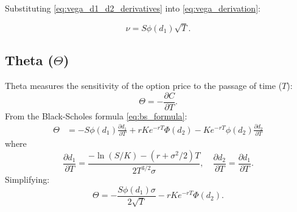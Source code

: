        Substituting \eqref{eq:vega_d1_d2_derivatives} into \eqref{eq:vega_derivation}:

        \begin{equation}
            \nu = S \phi(d_1) \sqrt{T}.
            \label{eq:vega_result}
        \end{equation}

    \subsection{Theta ($\Theta$)}
        Theta measures the sensitivity of the option price to the passage of time ($T$):
        \begin{equation}
            \Theta = -\frac{\partial C}{\partial T}.
            \label{eq:theta_definition}
        \end{equation}
        From the Black-Scholes formula \eqref{eq:bs_formula}:
        \begin{align}
            \Theta &=
                -S \phi(d_1) \frac{\partial d_1}{\partial T}
                + rK e^{-rT} \Phi(d_2)
                - K e^{-rT} \phi(d_2) \frac{\partial d_2}{\partial T}
            \label{eq:theta_derivation1}
        \end{align}
        where
        \begin{equation}
            \frac{\partial d_1}{\partial T} = \frac{-\ln(S/K) - (r + \sigma^2/2)T}{2T^{3/2} \sigma}, \quad
            \frac{\partial d_2}{\partial T} = \frac{\partial d_1}{\partial T}.
            \label{eq:theta_d1_d2_derivatives}
        \end{equation}
        Simplifying:
        \begin{equation}
            \Theta = -\frac{S \phi(d_1) \sigma}{2\sqrt{T}} - rK e^{-rT} \Phi(d_2).
            \label{eq:theta_result}
        \end{equation}

